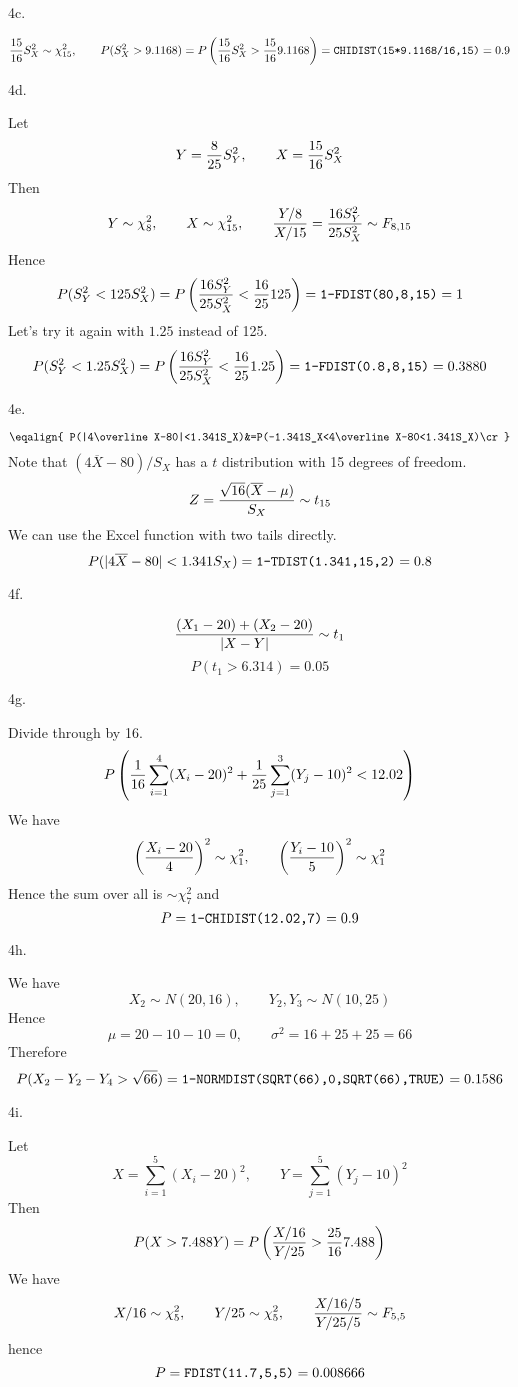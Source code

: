 \beginsection 4c.

$${15\over 16}S_X^2\sim \chi_{15}^2,\qquad
P(S_X^2>9.1168)=P\left({15\over 16}S_X^2>{15\over 16}9.1168\right)=
\hbox{\tt CHIDIST(15*9.1168/16,15)}=0.9$$

\beginsection 4d.

Let
$$Y={8\over25}S_Y^2,\qquad X={15\over16}S_X^2$$
Then
$$Y\sim\chi_8^2,\qquad
X\sim\chi_{15}^2,\qquad
{Y/8\over X/15}={16 S_Y^2\over25 S_X^2}\sim F_{8,15}$$
Hence
$$P(S_Y^2<125S_X^2)=P\left({16 S_Y^2\over25 S_X^2}<{16\over25}125\right)
=\hbox{\tt1-FDIST(80,8,15)}=1$$
Let's try it again with $1.25$ instead of 125.
$$P(S_Y^2<1.25S_X^2)=P\left({16 S_Y^2\over25 S_X^2}<{16\over25}1.25\right)
=\hbox{\tt1-FDIST(0.8,8,15)}=0.3880$$

\beginsection 4e.

$$\eqalign{
P(|4\overline X-80|<1.341S_X)&=P(-1.341S_X<4\overline X-80<1.341S_X)\cr
}$$
Note that $(4\overline X-80)/S_X$ has a $t$ distribution with 15 degrees of freedom.
$$Z={\sqrt{16}(\overline X-\mu)\over S_X}\sim t_{15}$$
We can use the Excel function with two tails directly.
$$P(|4\overline X-80|<1.341S_X)=\hbox{\tt 1-TDIST(1.341,15,2)}=0.8$$

\beginsection 4f.

$${(X_1-20)+(X_2-20)\over|X-Y|}\sim t_1$$
$$P(t_1>6.314)=0.05$$


\beginsection 4g.

Divide through by 16.
$$P\left({1\over16}\sum_{i=1}^4(X_i-20)^2+{1\over25}\sum_{j=1}^3(Y_j-10)^2<12.02\right)$$
We have
$$\left({X_i-20\over4}\right)^2\sim\chi_1^2,\qquad
\left({Y_i-10\over5}\right)^2\sim\chi_1^2
$$
Hence the sum over all is $\sim \chi_7^2$ and
$$P=\hbox{\tt 1-CHIDIST(12.02,7)}=0.9$$

\beginsection 4h.

We have
$$X_2\sim N(20,16),\qquad Y_2,Y_3\sim N(10,25)$$
Hence
$$\mu=20-10-10=0,\qquad\sigma^2=16+25+25=66$$
Therefore
$$P(X_2-Y_2-Y_4>\sqrt{66})=\hbox{\tt 1-NORMDIST(SQRT(66),0,SQRT(66),TRUE)}=0.1586$$

\beginsection 4i.

Let
$$X=\sum_{i=1}^5(X_i-20)^2,\qquad Y=\sum_{j=1}^5(Y_j-10)^2$$
Then
$$P(X>7.488Y)=P\left({X/16\over Y/25}>{25\over16}7.488\right)$$
We have
$$X/16\sim\chi_5^2,\qquad Y/25\sim\chi_5^2,\qquad{X/16/5\over Y/25/5}\sim F_{5,5}$$
hence
$$P=\hbox{\tt FDIST(11.7,5,5)}=0.008666$$

